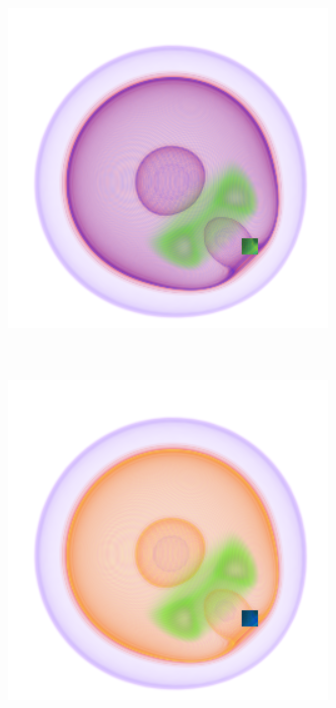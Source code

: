 \documentclass[twoside,twocolumn,10pt]{article}
\begin{document}
\begin{figure}
	\centering
	\begin{minipage}{.2\textwidth}
		\centering
		\includegraphics[width=1\linewidth]{nucleon_blue_crop}
		\label{fig:nucleon_2_blue}
	\end{minipage}~
	\begin{minipage}{.2\textwidth}
		\centering
		\includegraphics[width=1\linewidth]{nucleon_yellow_crop}

\end{minipage}
\end{figure}
\end{document}
